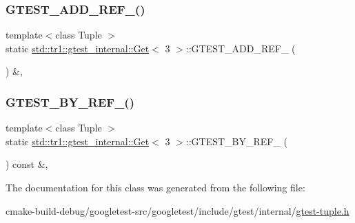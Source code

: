 \subsubsection{\texorpdfstring{GTEST\_ADD\_REF\_()}{GTEST\_ADD\_REF\_()}}
{\footnotesize\ttfamily template$<$class Tuple $>$ \\
static \mbox{\hyperlink{classstd_1_1tr1_1_1gtest__internal_1_1Get}{std\+::tr1\+::gtest\+\_\+internal\+::\+Get}}$<$ 3 $>$\+::G\+T\+E\+S\+T\+\_\+\+A\+D\+D\+\_\+\+R\+E\+F\+\_\+ (\begin{DoxyParamCaption}\item[{\mbox{\hyperlink{gtest-tuple_8h_a1b7f133d8aa02e0b7afed7b66781eeb7}{G\+T\+E\+S\+T\+\_\+\+T\+U\+P\+L\+E\+\_\+\+E\+L\+E\+M\+E\+N\+T\+\_\+}}(3, Tuple)}]{ }\end{DoxyParamCaption}) \&\hspace{0.3cm}{\ttfamily [inline]}, {\ttfamily [static]}}

\mbox{\label{classstd_1_1tr1_1_1gtest__internal_1_1Get_3_013_01_4_ab8c5283e6776308abc41aaad518a23c7}} 
\subsubsection{\texorpdfstring{GTEST\_BY\_REF\_()}{GTEST\_BY\_REF\_()}}
{\footnotesize\ttfamily template$<$class Tuple $>$ \\
static \mbox{\hyperlink{classstd_1_1tr1_1_1gtest__internal_1_1Get}{std\+::tr1\+::gtest\+\_\+internal\+::\+Get}}$<$ 3 $>$\+::G\+T\+E\+S\+T\+\_\+\+B\+Y\+\_\+\+R\+E\+F\+\_\+ (\begin{DoxyParamCaption}\item[{\mbox{\hyperlink{gtest-tuple_8h_a1b7f133d8aa02e0b7afed7b66781eeb7}{G\+T\+E\+S\+T\+\_\+\+T\+U\+P\+L\+E\+\_\+\+E\+L\+E\+M\+E\+N\+T\+\_\+}}(3, Tuple)}]{ }\end{DoxyParamCaption}) const \&\hspace{0.3cm}{\ttfamily [inline]}, {\ttfamily [static]}}



The documentation for this class was generated from the following file\+:\begin{DoxyCompactItemize}
\item 
cmake-\/build-\/debug/googletest-\/src/googletest/include/gtest/internal/\mbox{\hyperlink{gtest-tuple_8h}{gtest-\/tuple.\+h}}\end{DoxyCompactItemize}
